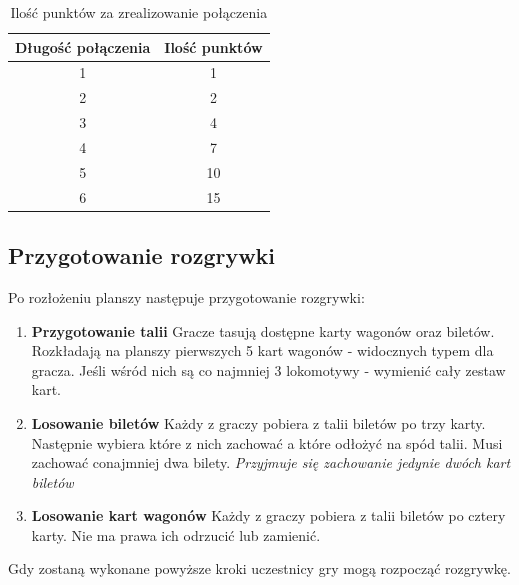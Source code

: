 \documentclass[12pt, oneside]{report}
\begin{document}
\begin{table}[h]
	\begin{center}
		\begin{tabular}{|c|c|} \hline
		\textbf{Długość połączenia} & \textbf{Ilość punktów} \\ \hline
		1 & 1 \\ \hline
		2 & 2 \\ \hline
		3 & 4 \\ \hline
		4 & 7 \\ \hline
		5 & 10 \\ \hline
		6 & 15 \\ \hline
		\end{tabular}	
		\caption{Ilość punktów za zrealizowanie połączenia}
		\label{table:points}
	\end{center}

\end{table}

\subsection{Przygotowanie rozgrywki}
Po rozłożeniu planszy następuje przygotowanie rozgrywki:
\begin{enumerate}
	\item \textbf{Przygotowanie talii}
	\subitem Gracze tasują dostępne karty wagonów oraz biletów. Rozkładają na planszy pierwszych 5 kart wagonów - widocznych typem dla gracza. Jeśli wśród nich są co najmniej 3 lokomotywy - wymienić cały zestaw kart.
	\item \textbf{Losowanie biletów}
	\subitem Każdy z graczy pobiera z talii biletów po trzy karty. Następnie wybiera które z nich zachować a które odłożyć na spód talii. Musi zachować conajmniej dwa bilety. \textit{Przyjmuje się zachowanie jedynie dwóch kart biletów}
	\item \textbf{Losowanie kart wagonów}
	\subitem Każdy z graczy pobiera z talii biletów po cztery karty. Nie ma prawa ich odrzucić lub zamienić.
\end{enumerate}
Gdy zostaną wykonane powyższe kroki uczestnicy gry mogą rozpocząć rozgrywkę. 
\end{document}
